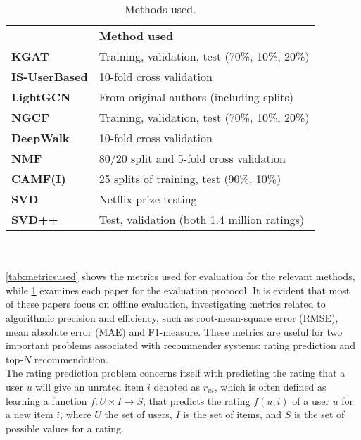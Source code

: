 \begin{table}[]\centering
    \caption{Methods used.}\label{tab:methodsused}
    \scriptsize
    \begin{tabular}{ll}\toprule
        &\textbf{Method used}\\\cmidrule{1-2}
        \textbf{KGAT\cite{KGAT}} & Training, validation, test (70\%, 10\%, 20\%) \\\cmidrule{1-2}
        \textbf{IS-UserBased\cite{GraphBasedCollaborativePaper}} & 10-fold cross validation  \\\cmidrule{1-2}
        \textbf{LightGCN\cite{LightGCN}} & From original authors (including splits) \\\cmidrule{1-2}
        \textbf{NGCF\cite{NGCF} } & Training, validation, test (70\%, 10\%, 20\%) \\\cmidrule{1-2}
        \textbf{DeepWalk\cite{DeepWalk}} & 10-fold cross validation \\\cmidrule{1-2}
        \textbf{NMF\cite{NMF} } & 80/20 split and 5-fold cross validation \\\cmidrule{1-2}
        \textbf{CAMF(I)\cite{baltrunasCAMF} } & 25 splits of training, test (90\%, 10\%) \\\cmidrule{1-2}
        \textbf{SVD\cite{standardMF} } & Netflix prize testing \\\cmidrule{1-2}
        \textbf{SVD++\cite{svd++} } & Test, validation (both 1.4 million ratings) \\\cmidrule{1-2}
    \bottomrule
    \end{tabular}
\end{table}
\\\\
\cref{tab:metricsused} shows the metrics used for evaluation for the relevant methods, while \cref{tab:methodsused} examines each paper for the evaluation protocol.
It is evident that most of these papers focus on offline evaluation, investigating metrics related to algorithmic precision and efficiency, such as root-mean-square error (RMSE), mean absolute error (MAE) and F1-measure.
These metrics are useful for two important problems associated with recommender systems: rating prediction and top-$N$ recommendation\cite{RecommenderHandbook2015}.
\\
The rating prediction problem concerns itself with predicting the rating that a user $u$ will give an unrated item $i$ denoted as $r_{ui}$, which is often defined as learning a function $f : U \times I \rightarrow S$, that predicts the rating $f(u, i)$ of a user $u$ for a new item $i$, where $U$ the set of users, $I$ is the set of items, and $S$ is the set of possible values for a rating.
